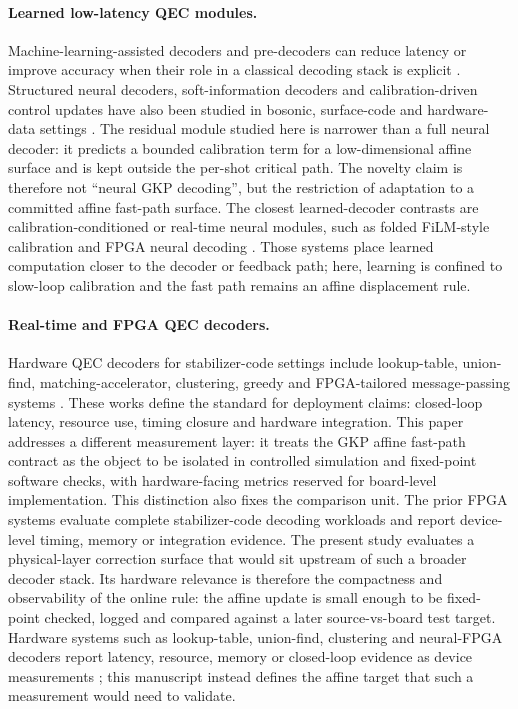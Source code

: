 \documentclass[11pt]{article}
\begin{document}
\paragraph{Learned low-latency QEC modules.}
Machine-learning-assisted decoders and pre-decoders can reduce latency or
improve accuracy when their role in a classical decoding stack is explicit
\cite{bausch2024,chamberland2026,stein2026,wang2022,peled2026,hanisch2026}.
Structured neural decoders, soft-information decoders and calibration-driven
control updates have also been studied in bosonic, surface-code and
hardware-data settings \cite{wang2022,peled2026,hanisch2026,sivak2026}.  The
residual module studied here is narrower than a full neural decoder: it
predicts a bounded calibration term for a low-dimensional affine surface and is
kept outside the per-shot critical path.  The novelty claim is therefore not
``neural GKP decoding'', but the restriction of adaptation to a committed
affine fast-path surface.
The closest learned-decoder contrasts are calibration-conditioned or real-time
neural modules, such as folded FiLM-style calibration and FPGA neural decoding
\cite{stein2026,yang2026}.  Those systems place learned computation closer to
the decoder or feedback path; here, learning is confined to slow-loop
calibration and the fast path remains an affine displacement rule.

\paragraph{Real-time and FPGA QEC decoders.}
Hardware QEC decoders for stabilizer-code settings include lookup-table,
union-find, matching-accelerator, clustering, greedy and FPGA-tailored
message-passing systems \cite{lilliput2022,helios2023,collision2025,
qldpcfpga2025,caune2024,yang2026,ziad2024,maurer2025}.  These
works define the standard for deployment claims: closed-loop latency,
resource use, timing closure and hardware integration.  This paper addresses a
different measurement layer: it treats the GKP affine fast-path contract as the
object to be isolated in controlled simulation and fixed-point software checks,
with hardware-facing metrics reserved for board-level implementation.
This distinction also fixes the comparison unit.  The prior FPGA systems
evaluate complete stabilizer-code decoding workloads and report device-level
timing, memory or integration evidence.  The present study evaluates a
physical-layer correction surface that would sit upstream of such a broader
decoder stack.  Its hardware relevance is therefore the compactness and
observability of the online rule: the affine update is small enough to be
fixed-point checked, logged and compared against a later source-vs-board test
target.
Hardware systems such as lookup-table, union-find, clustering and neural-FPGA
decoders report latency, resource, memory or closed-loop evidence as device
measurements \cite{lilliput2022,helios2023,collision2025,caune2024,yang2026};
this manuscript instead defines the affine target that such a measurement would
need to validate.
\end{document}
